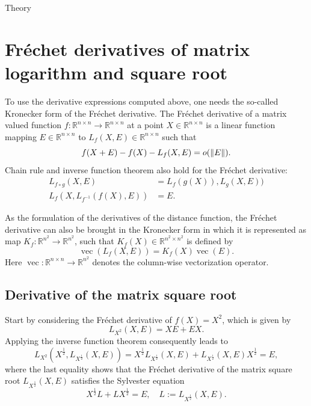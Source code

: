 \begin{chapter}{Theory}


\section{Fr\'{e}chet derivatives of matrix logarithm and square root} %
\label{sec:frechetderivatives}
To use the derivative expressions computed above, one needs the so-called Kronecker form of the Fr\'{e}chet derivative. The Fr\'{e}chet derivative
of a matrix valued function $f:\mathbb{R}^{n\times n}\to\mathbb{R}^{n\times n}$ at a point $X\in\mathbb{R}^{n\times n}$ is a linear function mapping $E\in\mathbb{R}^{n\times n}$
to $L_f(X,E)\in \mathbb{R}^{n\times n}$ such that
\begin{equation}
    f(X+E) - f(X) - L_f(X,E) = o(\| E \|).
\end{equation}
Chain rule and inverse function theorem also hold for the Fr\'{e}chet derivative:
\begin{align}
    L_{f\circ g}(X, E) &= L_{f}(g(X)),L_{g}(X,E))\\
    L_{f}(X, L_{f^{-1}}(f(X),E)) &= E.
\end{align}

As the formulation of the derivatives of the distance function, the Fr\'{e}chet derivative can also be brought in the Kronecker form in which it is represented as map
$K_f:\mathbb{R}^{n^2}\to\mathbb{R}^{n^2}$, such that $K_f(X)\in \mathbb{R}^{n^2\times n^2}$ is defined by
\begin{equation}
    \label{eq:kronckerform}
    \operatorname{vec}(L_f(X,E))=K_f(X)\operatorname{vec}(E).
\end{equation}
Here $\operatorname{vec}:\mathbb{R}^{n\times n}\to\mathbb{R}^{n^2}$ denotes the column-wise vectorization operator.

\subsection{Derivative of the matrix square root} %
\label{sub:Derivative of the matrix square root}
Start by considering the Fr\'{e}chet derivative of $f(X)=X^2$, which is given by
\begin{equation}
    L_{X^2}(X,E) = XE + EX.
\end{equation}
Applying the inverse function theorem consequently leads to
\begin{equation}
    L_{X^2}(X^{\frac{1}{2}},L_{X^{\frac{1}{2}}}(X,E))=X^{\frac{1}{2}}L_{X^{\frac{1}{2}}}(X,E) + L_{X^{\frac{1}{2}}}(X,E)X^{\frac{1}{2}} = E,
\end{equation}
where the last equality shows that the Fr\'{e}chet derivative of the matrix square root $L_{X^{\frac{1}{2}}}(X,E)$ satisfies the Sylvester equation 
\begin{equation}
    \label{eq:sylvester}
    X^{\frac{1}{2}}L + LX^{\frac{1}{2}} = E,\quad L:=L_{X^{\frac{1}{2}}}(X,E).
\end{equation}


\end{chapter}
